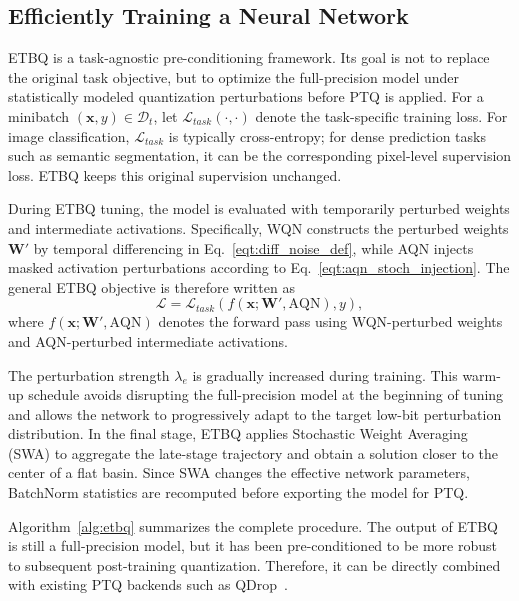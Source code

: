\documentclass{article}
\begin{document}
\subsection{Efficiently Training a Neural Network}
\label{sec:training}

ETBQ is a task-agnostic pre-conditioning framework. Its goal is not to replace the original task objective, but to optimize the full-precision model under statistically modeled quantization perturbations before PTQ is applied. For a minibatch $(\boldsymbol{x},y)\in\mathscr{D}_{t}$, let $\mathcal{L}_{task}(\cdot,\cdot)$ denote the task-specific training loss. For image classification, $\mathcal{L}_{task}$ is typically cross-entropy; for dense prediction tasks such as semantic segmentation, it can be the corresponding pixel-level supervision loss. ETBQ keeps this original supervision unchanged.

During ETBQ tuning, the model is evaluated with temporarily perturbed weights and intermediate activations. Specifically, WQN constructs the perturbed weights $\boldsymbol{W}'$ by temporal differencing in Eq.~\eqref{eqt:diff_noise_def}, while AQN injects masked activation perturbations according to Eq.~\eqref{eqt:aqn_stoch_injection}. The general ETBQ objective is therefore written as
\begin{equation}
\label{eqt:main_loss}
    \mathcal{L}
    =
    \mathcal{L}_{task}
    \left(
    f(\boldsymbol{x};\boldsymbol{W}',\mathrm{AQN}),
    y
    \right),
\end{equation}
where $f(\boldsymbol{x};\boldsymbol{W}',\mathrm{AQN})$ denotes the forward pass using WQN-perturbed weights and AQN-perturbed intermediate activations.

The perturbation strength $\lambda_e$ is gradually increased during training. This warm-up schedule avoids disrupting the full-precision model at the beginning of tuning and allows the network to progressively adapt to the target low-bit perturbation distribution. In the final stage, ETBQ applies Stochastic Weight Averaging (SWA) to aggregate the late-stage trajectory and obtain a solution closer to the center of a flat basin. Since SWA changes the effective network parameters, BatchNorm statistics are recomputed before exporting the model for PTQ.

Algorithm~\ref{alg:etbq} summarizes the complete procedure. The output of ETBQ is still a full-precision model, but it has been pre-conditioned to be more robust to subsequent post-training quantization. Therefore, it can be directly combined with existing PTQ backends such as QDrop~\cite{wei-qdrop-arxiv-2022}.
\end{document}
